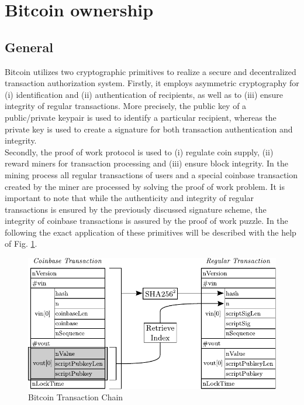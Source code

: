 \section{Bitcoin ownership} \label{sec:BitcoinOwnership}

\subsection{General} \label{sec:OwnershipGeneral}
Bitcoin utilizes two cryptographic primitives to realize a secure and decentralized transaction authorization system. Firstly, it employs asymmetric cryptography for (i) identification and (ii) authentication of recipients, as well as to (iii) ensure integrity of regular transactions. More precisely, the public key of a public/private keypair is used to identify a particular recipient, whereas the private key is used to create a signature for both transaction authentication and integrity.~\\

\noindent
Secondly, the proof of work protocol is used to (i) regulate coin supply, (ii) reward miners for transaction processing and (iii) ensure block integrity. In the mining process all regular transactions of users and a special coinbase transaction created by the miner are processed by solving the proof of work problem. It is important to note that while the authenticity and integrity of regular transactions is ensured by the previously discussed signature scheme, the integrity of coinbase transactions is assured by the proof of work puzzle. In the following the exact application of these primitives will be described with the help of Fig. \ref{fig:TransactionChain}.

\vspace{-5pt}
\begin{figure}[htbp]
\centering
\includegraphics[scale=1]{Images/Ownership.pdf}

\caption{Bitcoin Transaction Chain}
\label{fig:TransactionChain}
\end{figure}
\vspace{-10pt}

